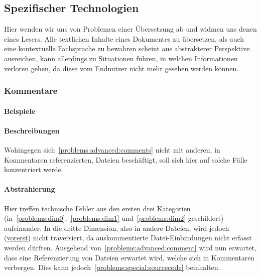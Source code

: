 \subsection{Spezifischer Technologien}\label{problems:special}%
Hier wenden wir uns von Problemen einer Übersetzung ab und widmen uns denen eines Lesers. Alle textlichen Inhalte eines Dokumentes zu übersetzen, als auch eine kontextuelle Fachsprache zu bewahren scheint aus abstrakterer Perspektive ausreichen, kann allerdings zu Situationen führen, in welchen Informationen verloren gehen, da diese vom Endnutzer nicht mehr gesehen werden können.%



\subsubsection{Kommentare}\label{problems:advanced:comments}
\paragraph*{Beispiele}
\paragraph*{Beschreibungen}
Wohingegen sich~\ref{problems:advanced:comments} nicht mit anderen, in Kommentaren referenzierten, Dateien beschäftigt, soll sich hier auf solche Fälle konzentriert werde.
\paragraph*{Abstrahierung}
Hier treffen technische Fehler aus den ersten drei Kategorien (in~\ref{problems:dim0},~\ref{problems:dim1} und~\ref{problems:dim2} geschildert) aufeinander. In die dritte Dimension, also in andere Dateien, wird jedoch (\hyperref[problems:special:comments]{vorerst}) nicht traversiert, da auskommentierte Datei-Einbindungen nicht erfasst werden dürften. 
Ausgehend von~\ref{problems:advanced:comment} wird nun erwartet, dass eine Referenzierung von Dateien erwartet wird, welche sich in Kommentaren verbergen. Dies kann jedoch~\ref{problems:special:sourcecode} beinhalten.


